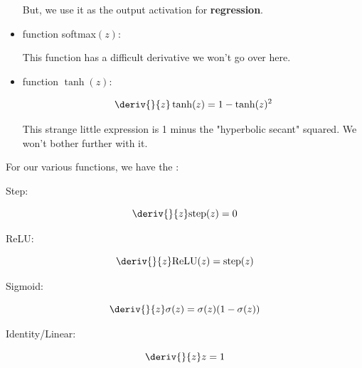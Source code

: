 \begin{itemize}
                But, we use it as the output activation for \textbf{regression}.
                
            \item {} function softmax$(z)$:
            
                This function has a difficult derivative we won't go over here. 
                
            \item {} function $\tanh(z)$:
            
                \begin{equation}
                    \deriv{}{z}\tanh(z)
                    =
                    1 - \tanh(z)^2
                \end{equation}
                
                This strange little expression is 1 minus the "hyperbolic secant" squared. We won't bother further with it.\\
        \end{itemize}
        
        
        \begin{notation}
            For our various  functions, we have the :
            
            Step:
            
            \begin{equation*}
                \deriv{}{z} \text{step}(z) = 0
            \end{equation*}
            
            ReLU:
            
            \begin{equation*}
                \deriv{}{z} \text{ReLU}(z) = \text{step}(z)
            \end{equation*}
            
            Sigmoid:
            
            \begin{equation*}
                \deriv{}{z}\sigma(z) 
                =
                \sigma(z)(1-\sigma(z))
            \end{equation*}
            
            Identity/Linear:
            
            \begin{equation*}
                \deriv{}{z} z 
                =
                1
            \end{equation*}
        \end{notation}
        
